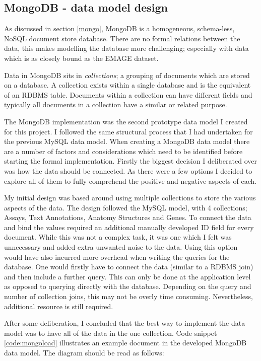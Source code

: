 \subsection{MongoDB  - data model design}\label{mongodesign}

As discussed in section \ref{mongo}, MongoDB is a homogeneous, schema-less, NoSQL document store database. There are no formal relations between the data, this makes modelling the database more challenging; especially with data which is as closely bound as the EMAGE dataset.

Data in MongoDB sits in \textit{collections}; a grouping of documents which are stored on a database. A collection exists within a single database and is the equivalent of an RDBMS table. Documents within a collection can have different fields and typically all documents in a collection have a similar or related purpose. 

The MongoDB implementation was the second prototype data model I created for this project. I followed the same structural process that I had undertaken for the previous MySQL data model. When creating a MongoDB data model there are a number of factors and considerations which need to be identified before starting the formal implementation. Firstly the biggest decision I deliberated over was how the data should be connected. As there were a few options I decided to explore all of them to fully comprehend the positive and negative aspects of each.

My initial design was based around using multiple collections to store the various aspects of the data. The design followed the MySQL model, with 4 collections; Assays, Text Annotations, Anatomy Structures and Genes. To connect the data and bind the values required an additional manually developed ID field for every document. While this was not a complex task, it was one which I felt was unnecessary and added extra unwanted noise to the data. Using this option would have also incurred more overhead when writing the queries for the database. One would firstly have to connect the data (similar to a RDBMS join) and then include a further query. This can only be done at the application level as opposed to querying directly with the database. Depending on the query and number of collection joins, this may not be overly time consuming. Nevertheless, additional resource is still required. 

After some deliberation, I concluded that the best way to implement the data model was to have all of the data in the one collection. Code snippet \ref{code:mongoload} illustrates an example document in the developed MongoDB data model. The diagram should be read as follows:

